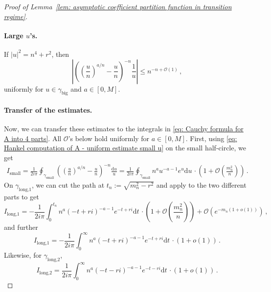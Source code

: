 \documentclass{article}
\theoremstyle{remark}
\newcommand{\cO}{\mathcal{O}}
\newcommand{\abs}[1]{{\left|#1\right|}}
\begin{document}
\begin{proof}[Proof of Lemma~\ref{lem: asymptotic coefficient partition function in transition regime}]
    \paragraph{Large $u$'s.}
    If $\abs{u}^2 = n^4+r^2$, then
    \begin{equation}\label{eq: Hankel computation of A - uniform estimate large u}
       \abs{ \left( \left(\frac{u}{n}\right)^{a/n} - \frac{u}{n} \right)^{-n} \frac1u }
        \le n^{-n+\cO(1)}\,,
    \end{equation}
    uniformly for $u\in\gamma_\text{big}$ and $a\in[0,M]$.

    \paragraph{Transfer of the estimates.}
    Now, we can transfer these estimates to the integrals in \eqref{eq: Cauchy formula for A into 4 parts}.
    All $\cO$'s below hold uniformly for $a\in[0,M]$.
    First, using \eqref{eq: Hankel computation of A - uniform estimate small u} on the small half-circle, we get
    \begin{align*}
        I_\text{small} 
        = \frac{1}{2i\pi} \oint_{\gamma_\text{small}} \left( \left(\frac{u}{n}\right)^{a/n} - \frac{u}{n} \right)^{-n} \frac{\mathrm{d}u}{u}
        = \frac{1}{2i\pi} \oint_{\gamma_\text{small}} n^{a} u^{-a-1} e^u \mathrm{d}u\,\cdot \left( 1 + \cO\left(\frac{m_n^2}{n}\right) \right) \,.
    \end{align*}
    On $\gamma_\text{long,1}$, we can cut the path at $t_n:=\sqrt{m_n^2-r^2}$ and apply  to the two different parts to get
    \begin{equation*}
        I_\text{long,1} 
        = - \frac{1}{2i\pi} \int_0^{t_n} n^{a} (-t+ri)^{-a-1} e^{-t+ri} \mathrm{d}t \,\cdot \left( 1 + \cO\left(\frac{m_n^2}{n}\right) \right)
        + \cO\left( e^{-m_n(1+o(1))} \right) \,,
    \end{equation*}
    and further
    \begin{equation*}
        I_\text{long,1} 
        = - \frac{1}{2i\pi} \int_0^{\infty} n^{a} (-t+ri)^{-a-1} e^{-t+ri} \mathrm{d}t \,\cdot \left( 1 + o(1) \right) \,.
    \end{equation*}
    Likewise, for $\gamma_\text{long,2}$,
    \begin{equation*}
        I_\text{long,2} 
        = \frac{1}{2i\pi} \int_0^{\infty} n^{a} (-t-ri)^{-a-1} e^{-t-ri} \mathrm{d}t \,\cdot \left( 1 + o(1) \right) \,.

\end{equation*}
\end{proof}
\end{document}
